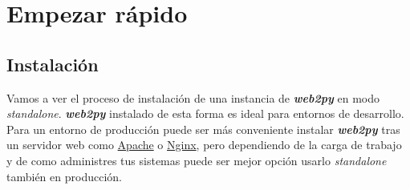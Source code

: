 \documentclass[
  12pt,
  spanish,
]{article}
\begin{document}
\hypertarget{empezar-ruxe1pido}{%
\section{Empezar rápido}\label{empezar-ruxe1pido}}

\hypertarget{instalaciuxf3n}{%
\subsection{Instalación}\label{instalaciuxf3n}}

Vamos a ver el proceso de instalación de una instancia de
\textbf{\emph{web2py}} en modo \emph{standalone}. \textbf{\emph{web2py}}
instalado de esta forma es ideal para entornos de desarrollo. Para un
entorno de producción puede ser más conveniente instalar
\textbf{\emph{web2py}} tras un servidor web como
\href{https://www.apache.org/}{Apache} o
\href{https://www.nginx.com/}{Nginx}, pero dependiendo de la carga de
trabajo y de como administres tus sistemas puede ser mejor opción usarlo
\emph{standalone} también en producción.
\end{document}
